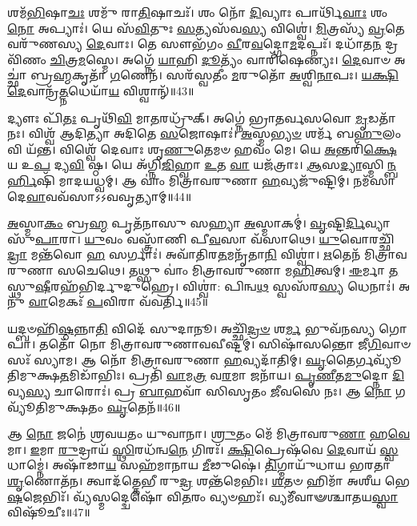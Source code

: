 𑌶𑌮᳴\-\ul{𑌭𑌿}\-𑌷𑌾\-\ul{𑌚𑌃} 𑌶𑌮𑍁᳴ 𑌰𑌾\-\ul{𑌤𑌿}\-𑌷𑌾𑌚𑌃᳴।
𑌶𑌂 𑌨𑍋᳴ \ul{𑌦𑌿}\-𑌵𑍍𑌯𑌾𑌃 𑌪𑌾𑌰𑍍𑌥𑌿᳴\-\ul{𑌵𑌾𑌃} 𑌶𑌂 \ul{𑌨𑍋} 𑌅𑌪𑍍𑌯𑌾𑌃॑।
𑌯𑍇 𑌸᳴\-\ul{𑌵𑌿}\-𑌤𑍁𑌃 \ul{𑌸}\-𑌤𑍍𑌯𑌸᳴𑌵\-\ul{𑌸𑍍𑌯} 𑌵𑌿𑌶𑍍𑌵𑍇॑।
\-\ul{𑌮𑌿}\-𑌤𑍍𑌰𑌸𑍍𑌯᳴ \ul{𑌵𑍍𑌰}\-𑌤𑍇 𑌵𑌰𑍁᳴𑌣𑌸𑍍𑌯 \ul{𑌦𑍇}\-𑌵𑌾𑌃।
𑌤𑍇 𑌸𑍗𑌭᳴𑌗𑌂 \ul{𑌵𑍀}\-𑌰\-\ul{𑌵}\-𑌦𑍍𑌗𑍋\-\ul{𑌮}\-𑌦𑌪𑍍𑌨𑌃᳴।
𑌦𑌧𑌾᳴𑌤\-\ul{𑌨} 𑌦𑍍𑌰𑌵𑌿᳴𑌣𑌂 \ul{𑌚𑌿}\-𑌤𑍍𑌰\-\ul{𑌮}\-𑌸𑍍𑌮𑍇।
𑌅𑌗𑍍𑌨𑍇᳴ \ul{𑌯𑌾}\-𑌹𑌿 \ul{𑌦𑍂}\-𑌤𑍍𑌯𑌂᳴ 𑌵𑌾𑌰𑌿᳴𑌷𑍇𑌣𑍍𑌯𑌃।
\-\ul{𑌦𑍇}\-𑌵𑌾𑍞 𑌅𑌚𑍍𑌛𑌾॑ 𑌬𑍍𑌰\-\ul{𑌹𑍍𑌮}\-𑌕𑍃𑌤𑌾᳴ \ul{𑌗}\-𑌣𑍇𑌨᳴।
𑌸𑌰᳴𑌸𑍍𑌵𑌤𑍀𑌂 \ul{𑌮}\-𑌰𑍁𑌤𑍋᳴ \ul{𑌅}\-𑌶𑍍𑌵𑌿\-\ul{𑌨𑌾}\-𑌪𑌃।
\-\ul{𑌯}\-\-\ul{𑌕𑍍𑌷𑌿} \ul{𑌦𑍇}\-𑌵𑌾𑌨𑍍𑌰᳴\-\ul{𑌤𑍍𑌨}\-𑌧𑍇𑌯𑌾᳴\-\ul{𑌯} 𑌵𑌿𑌶𑍍𑌵𑌾𑌨𑍍᳴॥43॥

𑌦𑍍𑌯𑍗𑌃 𑌪𑌿᳴\-\ul{𑌤𑌃} 𑌪𑍃𑌥𑌿᳴\-\ul{𑌵𑌿} 𑌮𑌾\-\ul{𑌤}\-𑌰𑌧𑍍𑌰𑍁᳴𑌕𑍍।
𑌅𑌗𑍍𑌨𑍇॑ 𑌭𑍍𑌰𑌾𑌤𑌰𑍍𑌵𑌸𑌵𑍋 \ul{𑌮𑍃}\-𑌡𑌤𑌾᳴ 𑌨𑌃।
𑌵𑌿𑌶𑍍𑌵᳴ 𑌆𑌦𑌿𑌤𑍍𑌯𑌾 𑌅𑌦𑌿𑌤𑍇 \ul{𑌸}\-𑌜𑍋𑌷𑌾𑌃॑।
\-\ul{𑌅}\-𑌸𑍍𑌮\-\ul{𑌭𑍍𑌯}\-\-\ul{𑍞} 𑌶𑌰𑍍𑌮᳴ 𑌬\-\ul{𑌹𑍁}\-𑌲𑌂 𑌵𑌿 𑌯᳴𑌨𑍍𑌤।
𑌵𑌿𑌶𑍍𑌵𑍇᳴ 𑌦𑍇𑌵𑌾𑌃 𑌶𑍃\-\ul{𑌣𑍁}\-𑌤𑍇𑌮𑍞 𑌹𑌵𑌂᳴ 𑌮𑍇।
𑌯𑍇 \ul{𑌅}\-𑌨𑍍𑌤𑌰𑌿᳴\-\ul{𑌕𑍍𑌷𑍇} 𑌯 𑌉\-\ul{𑌪} 𑌦𑍍𑌯\-\ul{𑌵𑌿} 𑌷𑍍𑌠।
𑌯𑍇 𑌅᳴𑌗𑍍𑌨𑌿\-\ul{𑌜𑌿}\-𑌹𑍍𑌵𑌾 \ul{𑌉}\-𑌤 \ul{𑌵𑌾} 𑌯𑌜᳴𑌤𑍍𑌰𑌾𑌃।
\-\ul{𑌆}\-𑌸\-\ul{𑌦𑍍𑌯𑌾}\-𑌸𑍍𑌮𑌿\-\ul{𑌨𑍍𑌬}\-\-\ul{𑌰𑍍}\-𑌹𑌿𑌷𑌿᳴ 𑌮𑌾𑌦𑌯𑌧𑍍𑌵𑌮𑍍।
𑌆 𑌵𑌾𑌂॑ 𑌮𑌿𑌤𑍍𑌰𑌾𑌵𑌰𑍁𑌣𑌾 \ul{𑌹}\-𑌵𑍍𑌯𑌜𑍁᳴𑌷𑍍𑌟𑌿𑌮𑍍।
𑌨𑌮᳴𑌸𑌾 𑌦𑍇\-\ul{𑌵𑌾}\-𑌵𑌵᳴𑌸𑌾𑌽𑌽𑌵𑌵𑍃𑌤𑍍𑌯𑌾𑌮𑍍॥44॥

\-\ul{𑌅}\-𑌸𑍍𑌮𑌾\-\ul{𑌕𑌂} 𑌬𑍍𑌰\-\ul{𑌹𑍍𑌮} 𑌪𑍃𑌤᳴𑌨𑌾𑌸𑍁 𑌸𑌹𑍍𑌯𑌾 \ul{𑌅}\-𑌸𑍍𑌮𑌾𑌕𑌮𑍍॑।
\-\ul{𑌵𑍃}\-𑌷𑍍𑌟𑌿\-\ul{𑌰𑍍𑌦𑌿}\-𑌵𑍍𑌯𑌾 𑌸𑍁᳴\-\ul{𑌪𑌾}\-𑌰𑌾।
\-\ul{𑌯𑍁}\-𑌵𑌂 𑌵𑌸𑍍𑌤𑍍𑌰𑌾᳴𑌣𑌿 𑌪𑍀\-\ul{𑌵}\-𑌸𑌾 𑌵᳴𑌸𑌾𑌥𑍇।
\-\ul{𑌯𑍁}\-𑌵𑍋𑌰𑌚𑍍𑌛𑌿᳴\-\ul{𑌦𑍍𑌰𑌾} 𑌮𑌨𑍍𑌤᳴𑌵𑍋 \ul{𑌹} 𑌸𑌰𑍍𑌗𑌾𑌃॑।
𑌅𑌵𑌾᳴𑌤𑌿𑌰\-\ul{𑌤}\-𑌮𑌨𑍃᳴𑌤𑌾\-\ul{𑌨𑌿} 𑌵𑌿𑌶𑍍𑌵𑌾॑।
\-\ul{𑌋}\-𑌤𑍇𑌨᳴ 𑌮𑌿𑌤𑍍𑌰𑌾𑌵𑌰𑍁𑌣𑌾 𑌸𑌚𑍇𑌥𑍇।
𑌤𑌥𑍍𑌸𑍁 𑌵𑌾𑌂॑ 𑌮𑌿𑌤𑍍𑌰𑌾𑌵𑌰𑍁𑌣𑌾 𑌮\-\ul{𑌹𑌿}\-𑌤𑍍𑌵𑌮𑍍।
\-\ul{𑌈}\-𑌰𑍍𑌮𑌾 \ul{𑌤}\-𑌸𑍍𑌥𑍁\-\ul{𑌷𑍀}\-𑌰𑌹᳴𑌭𑌿𑌰𑍍𑌦𑍁𑌦𑍁𑌹𑍍𑌰𑍇।
𑌵𑌿𑌶𑍍𑌵𑌾॑: 𑌪𑌿𑌨𑍍𑌵\-\ul{𑌥} 𑌸𑍍𑌵𑌸᳴𑌰\-\ul{𑌸𑍍𑌯} 𑌧𑍇𑌨𑌾𑌃॑।
𑌅𑌨𑍁᳴ \ul{𑌵𑌾}\-𑌮𑍇𑌕𑌃᳴ \ul{𑌪}\-𑌵𑌿𑌰𑌾 𑌵᳴𑌵𑌰𑍍𑌤𑌿॥45॥

𑌯𑌦𑍍𑌬𑍞𑌹𑌿᳴\-\ul{𑌷𑍍𑌠}\-𑌨𑍍𑌨𑌾\-\ul{𑌤𑌿} 𑌵𑌿𑌦𑍇᳴ 𑌸𑍁𑌦𑌾𑌨𑍂।
𑌅𑌚𑍍𑌛𑌿᳴\-\ul{𑌦𑍍𑌰}\-\-\ul{𑍞} 𑌶\-\ul{𑌰𑍍𑌮} 𑌭𑍁𑌵᳴𑌨𑌸𑍍𑌯 𑌗𑍋𑌪𑌾।
𑌤𑌤𑍋᳴ 𑌨𑍋 𑌮𑌿𑌤𑍍𑌰𑌾𑌵𑌰𑍁𑌣𑌾𑌵𑌵𑍀𑌷𑍍𑌟𑌮𑍍।
𑌸𑌿𑌷𑌾᳴𑌸𑌨𑍍𑌤𑍋 𑌜𑍀\-\ul{𑌗𑌿}\-𑌵𑌾𑍞𑌸𑌃᳴ 𑌸𑍍𑌯𑌾𑌮।
𑌆 𑌨𑍋᳴ 𑌮𑌿𑌤𑍍𑌰𑌾𑌵𑌰𑍁𑌣𑌾 \ul{𑌹}\-𑌵𑍍𑌯𑌦𑌾᳴𑌤𑌿𑌮𑍍।
\-\ul{𑌘𑍃}\-𑌤𑍈𑌰𑍍𑌗𑌵𑍍𑌯𑍂᳴𑌤𑌿𑌮𑍁𑌕𑍍𑌷\-\ul{𑌤}\-𑌮𑌿𑌡𑌾᳴𑌭𑌿𑌃।
𑌪𑍍𑌰𑌤𑌿᳴ \ul{𑌵𑌾}\-𑌮\-\ul{𑌤𑍍𑌰} 𑌵\-\ul{𑌰}\-𑌮𑌾 𑌜𑌨𑌾᳴𑌯।
\-\ul{𑌪𑍃}\-\-\ul{𑌣𑍀}\-𑌤\-\ul{𑌮𑍁}\-𑌦𑍍𑌨𑍋 \ul{𑌦𑌿}\-𑌵𑍍𑌯\-\ul{𑌸𑍍𑌯} 𑌚𑌾𑌰𑍋𑌃॑।
𑌪𑍍𑌰 \ul{𑌬𑌾}\-𑌹𑌵𑌾᳴ 𑌸𑌿𑌸𑍃𑌤𑌂 \ul{𑌜𑍀}\-𑌵𑌸𑍇᳴ 𑌨𑌃।
𑌆 \ul{𑌨𑍋} 𑌗𑌵𑍍𑌯𑍂᳴𑌤𑌿𑌮𑍁𑌕𑍍𑌷𑌤𑌂 \ul{𑌘𑍃}\-𑌤𑍇𑌨᳴॥46॥

𑌆 \ul{𑌨𑍋} 𑌜𑌨𑍇॑ 𑌶𑍍𑌰𑌵𑌯𑌤𑌂 𑌯𑍁𑌵𑌾𑌨𑌾।
\-\ul{𑌶𑍍𑌰𑍁}\-𑌤𑌂 𑌮𑍇᳴ 𑌮𑌿𑌤𑍍𑌰𑌾𑌵𑌰𑍁\-\ul{𑌣𑌾} 𑌹\-\ul{𑌵𑍇}\-𑌮𑌾।
\-\ul{𑌇}\-𑌮𑌾 \ul{𑌰𑍁}\-𑌦𑍍𑌰𑌾𑌯᳴ \ul{𑌸𑍍𑌥𑌿}\-𑌰𑌧᳴𑌨𑍍𑌵\-\ul{𑌨𑍇} 𑌗𑌿𑌰𑌃᳴।
\-\ul{𑌕𑍍𑌷𑌿}\-𑌪𑍍𑌰𑍇𑌷᳴𑌵𑍇 \ul{𑌦𑍇}\-𑌵𑌾𑌯᳴ \ul{𑌸𑍍𑌵}\-𑌧𑌾𑌮𑍍𑌨𑍇॑।
𑌅𑌷𑌾᳴𑌢𑌾\-\ul{𑌯} 𑌸𑌹᳴𑌮𑌾𑌨𑌾𑌯 \ul{𑌮𑍀}\-𑌢𑍁𑌷𑍇॑।
\-\ul{𑌤𑌿}\-𑌗𑍍𑌮𑌾𑌯𑍁᳴𑌧𑌾𑌯 𑌭𑌰𑌤𑌾 \ul{𑌶𑍃}\-𑌣𑍋𑌤᳴𑌨।
𑌤𑍍𑌵𑌾𑌦᳴𑌤𑍍𑌤𑍇𑌭𑍀 𑌰𑍁\-\ul{𑌦𑍍𑌰} 𑌶𑌨𑍍𑌤᳴𑌮𑍇𑌭𑌿𑌃।
\-\ul{𑌶}\-𑌤𑍞 𑌹𑌿𑌮𑌾᳴ 𑌅𑌶𑍀𑌯 𑌭𑍇\-\ul{𑌷}\-𑌜𑍇𑌭𑌿𑌃᳴।
𑌵𑍍𑌯᳴𑌸𑍍𑌮𑌦𑍍𑌦𑍍𑌵𑍇𑌷𑍋᳴ 𑌵𑌿\-\ul{𑌤}\-𑌰𑌂 𑌵𑍍𑌯𑍞𑌹𑌃᳴।
𑌵𑍍𑌯𑌮𑍀᳴𑌵𑌾𑍟𑌶𑍍𑌚𑌾𑌤𑌯\-\ul{𑌸𑍍𑌵𑌾} 𑌵𑌿𑌷𑍂᳴𑌚𑍀𑌃॥47॥

